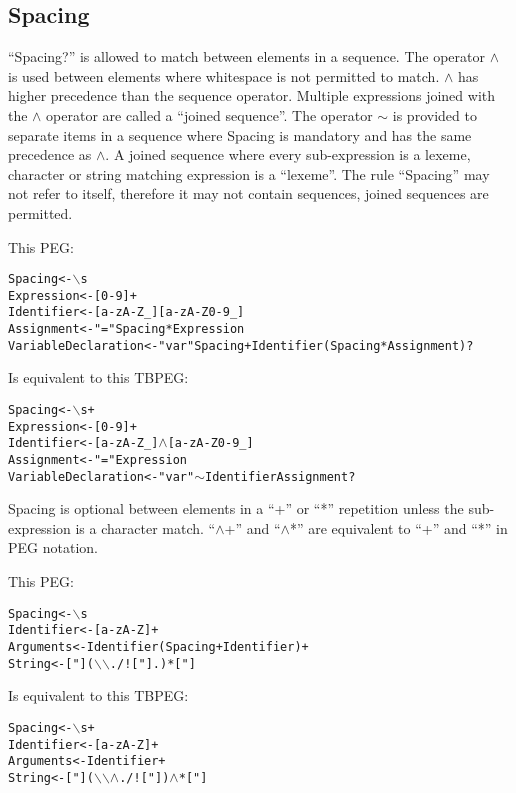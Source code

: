 \documentclass[a4paper,11pt]{article}
\begin{document}
\subsection{Spacing}
``Spacing?'' is allowed to match between elements in a sequence.
The operator $\wedge$ is used between elements where whitespace is not permitted to match.
$\wedge$ has higher precedence than the sequence operator.
Multiple expressions joined with the $\wedge$ operator are called a ``joined sequence''.
The operator $\sim$ is provided to separate items in a sequence where Spacing is mandatory and has the same precedence as $\wedge$.
A joined sequence where every sub-expression is a lexeme, character or string matching expression is a ``lexeme''.
The rule ``Spacing'' may not refer to itself, therefore it may not contain sequences, joined sequences are permitted.

This PEG:
\begin{alltt}
    Spacing             <- \(\backslash\)s
    Expression          <- [0-9]+
    Identifier          <- [a-zA-Z\_][a-zA-Z0-9\_]
    Assignment          <- "=" Spacing* Expression
    VariableDeclaration <- "var" Spacing+ Identifier (Spacing* Assignment)?
\end{alltt}

Is equivalent to this TBPEG:
\begin{alltt}
    Spacing             <- \(\backslash\)s+
    Expression          <- [0-9]+
    Identifier          <- [a-zA-Z\_] \(\wedge\) [a-zA-Z0-9\_]
    Assignment          <- "=" Expression
    VariableDeclaration <- "var" \(\sim\) Identifier Assignment?
\end{alltt}

Spacing is optional between elements in a ``+'' or ``*'' repetition unless the sub-expression is a character match.
``$\wedge$+'' and ``$\wedge$*'' are equivalent to ``+'' and ``*'' in PEG notation.

This PEG:
\begin{alltt}
    Spacing    <- \(\backslash\)s
    Identifier <- [a-zA-Z]+
    Arguments  <- Identifier (Spacing+ Identifier)+
    String     <- ["] (\(\backslash\)\(\backslash\). / ! ["] .)* ["]
\end{alltt}

Is equivalent to this TBPEG:
\begin{alltt}
    Spacing    <- \(\backslash\)s+
    Identifier <- [a-zA-Z]+
    Arguments  <- Identifier+
    String     <- ["] (\(\backslash\)\(\backslash\) \(\wedge\) . / ! ["] )\(\wedge\)* ["]
\end{alltt}
\end{document}
